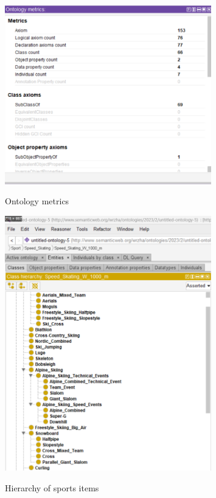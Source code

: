 \documentclass[12pt]{article}
\begin{document}
    \begin{figure}[h]
        \centering
        \includegraphics[width=0.8\textwidth]{14_1.png}\\
        \caption{Ontology metrics}
        \label{fig:roc}
        \end{figure}
    \begin{figure}[h]
        \centering
        \includegraphics[width=0.8\textwidth]{14_2.png}\\
        \caption{ Hierarchy of sports items}
        \label{fig:roc}
        \end{figure}
\end{document}
